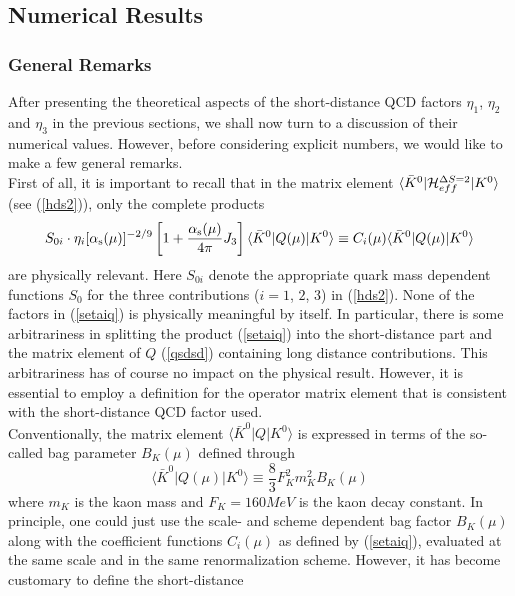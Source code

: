 \subsection{Numerical Results}
\label{sec:HeffKKbar:Num}

\subsubsection{General Remarks}
\label{sec:HeffKKbar:Num:Rem}
After presenting the theoretical aspects of the short-distance
QCD factors $\eta_1$, $\eta_2$ and $\eta_3$ in the previous
sections, we shall now turn to a discussion of their
numerical values. However, before considering explicit numbers,
we would like to make a few general remarks.
\\
First of all, it is important to recall
that in the matrix element
$\langle\bar K^0|{\cal H}^{\Delta S=2}_{eff}|K^0\rangle$
(see (\ref{hds2})), only the complete products
\begin{equation}\label{setaiq}
S_{0i}\cdot \eta_i[\alpha_{\rm s}(\mu)]^{-2/9}\left[
1+\frac{\alpha_{\rm s}(\mu)}{4\pi}J_3\right]
\langle\bar K^0|Q(\mu)|K^0\rangle\equiv
C_i(\mu) \langle\bar K^0|Q(\mu)|K^0\rangle
\end{equation}
are physically relevant.  Here $S_{0i}$ denote the appropriate quark
mass dependent functions $S_0$ for the three contributions ($i=1$, $2$,
$3$) in (\ref{hds2}).  None of the factors in (\ref{setaiq}) is
physically meaningful by itself. In particular, there is some
arbitrariness in splitting the product (\ref{setaiq}) into the
short-distance part and the matrix element of $Q$ (\ref{qsdsd})
containing long distance contributions. This arbitrariness has of
course no impact on the physical result. However, it is essential to
employ a definition for the operator matrix element that is consistent
with the short-distance QCD factor used.
\\
Conventionally, the matrix element $\langle\bar K^0|Q|K^0\rangle$
is expressed in terms of the so-called bag parameter $B_K(\mu)$
defined through
\begin{equation}\label{bkdef}
\langle\bar K^0|Q(\mu)|K^0\rangle\equiv\frac{8}{3}F^2_K m^2_K B_K(\mu)
\end{equation}
where $m_K$ is the kaon mass and $F_K=160 MeV$ is the kaon decay
constant. In principle, one could just use the scale- and scheme
dependent bag factor $B_K(\mu)$ along with the coefficient
functions $C_i(\mu)$ as defined by (\ref{setaiq}), evaluated
at the same scale and in the same renormalization scheme.
However, it has become customary to define the short-distance
